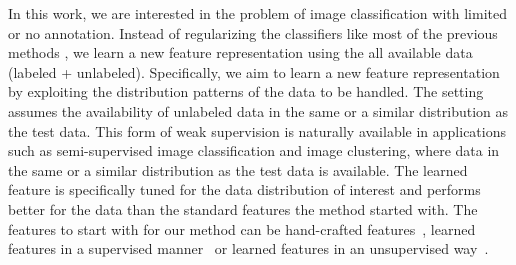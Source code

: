In this work, we are interested in the problem of  image classification 
with limited or no annotation. Instead of regularizing the
classifiers like most of the previous methods \citep{SemiSVM, Joachims:1999,
  SemiBoost, SemiForest}, we learn a new feature representation 
using the all available data (labeled + unlabeled). 
Specifically, we aim to learn a new feature representation by exploiting 
the distribution patterns of the data to be handled. The setting assumes the availability of 
unlabeled data in the same or a similar distribution as the test data. 
This form of weak supervision is naturally available in applications such as
semi-supervised  image classification and image clustering, where data in the same or a similar 
distribution as the test data is available. The learned feature is specifically tuned for the data distribution of interest 
and performs better for the data than the standard features the method started with.  
The features to start with for our method can be hand-crafted features~\citep{gist, lbp,phog,siftllc:cvpr10},  
learned features in a supervised manner~\citep{decaf, rich:feature:cvpr14, deep:bmvc14} or 
learned features in an unsupervised way~\citep{stl-10, cnnfet14, feature:context, feature:LSTM, feature:video}.  

